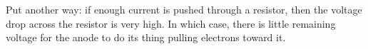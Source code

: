 \documentclass[11pt, oneside]{amsart}
\begin{document}
Put another way: if enough current is pushed through a resistor, then
the voltage drop across the resistor is very high. In which case, there
is little remaining voltage for the anode to do its thing pulling
electrons toward it.

\end{document}
